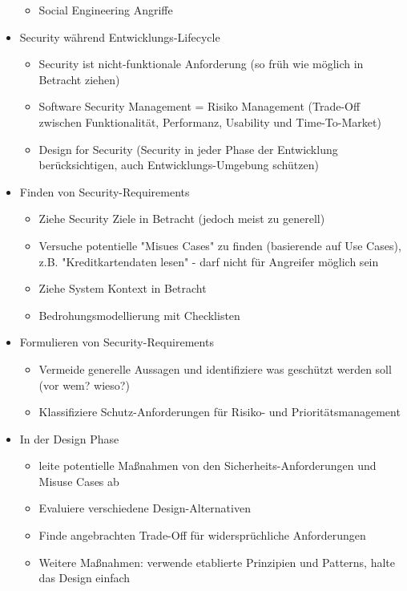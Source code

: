 \documentclass[paper=a4, fontsize=11pt]{scrartcl} %
\numberwithin{equation}{section} %
\numberwithin{figure}{section} %
\numberwithin{table}{section} %
\begin{document}
\begin{itemize}
\begin{itemize}
    \item Social Engineering Angriffe
  \end{itemize}
  \item Security während Entwicklungs-Lifecycle
  \begin{itemize}
    \item Security ist nicht-funktionale Anforderung (so früh wie möglich in Betracht ziehen)
    \item Software Security Management = Risiko Management (Trade-Off zwischen Funktionalität, Performanz, Usability und Time-To-Market)
    \item Design for Security (Security in jeder Phase der Entwicklung berücksichtigen, auch Entwicklungs-Umgebung schützen)
  \end{itemize}
  \item Finden von Security-Requirements
  \begin{itemize}
    \item Ziehe Security Ziele in Betracht (jedoch meist zu generell)
    \item Versuche potentielle "Misues Cases" zu finden (basierende auf Use Cases), z.B. "Kreditkartendaten lesen" - darf nicht für Angreifer möglich sein
    \item Ziehe System Kontext in Betracht
    \item Bedrohungsmodellierung mit Checklisten
  \end{itemize}
  \item Formulieren von Security-Requirements
  \begin{itemize}
    \item Vermeide generelle Aussagen und identifiziere was geschützt werden soll (vor wem? wieso?)
    \item Klassifiziere Schutz-Anforderungen für Risiko- und Prioritätsmanagement
  \end{itemize}
  \item In der Design Phase
  \begin{itemize}
    \item leite potentielle Maßnahmen von den Sicherheits-Anforderungen und Misuse Cases ab
    \item Evaluiere verschiedene Design-Alternativen
    \item Finde angebrachten Trade-Off für widersprüchliche Anforderungen
    \item Weitere Maßnahmen: verwende etablierte Prinzipien und Patterns, halte das Design einfach
  \end{itemize}

\end{itemize}
\end{document}
